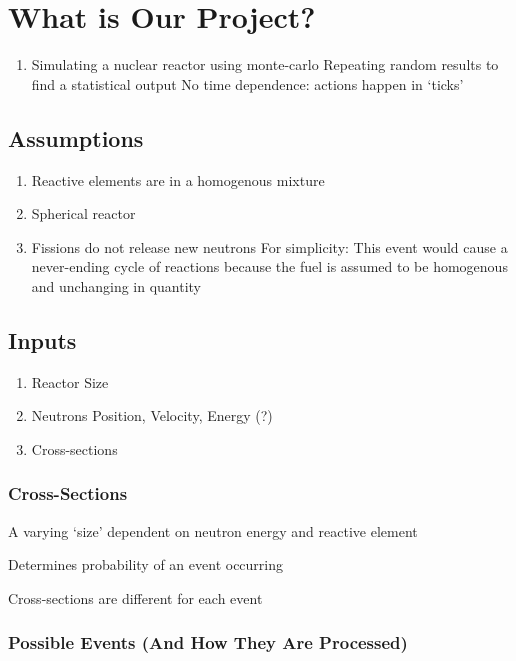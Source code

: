 \documentclass{notes}
\begin{document}
\section{What is Our Project?}

\begin{enumerate}
    \item Simulating a nuclear reactor using monte-carlo
    \subitem Repeating random results to find a statistical output
    \subitem \indicates No time dependence: actions happen in `ticks'
\end{enumerate}

\subsection{Assumptions}

\begin{enumerate}
    \item Reactive elements are in a homogenous mixture
    \item Spherical reactor
    \item Fissions do not release new neutrons
    \subitem For simplicity: This event would cause a never-ending cycle of reactions because the fuel is assumed to be homogenous and unchanging in quantity
\end{enumerate}

\subsection{Inputs}

\begin{enumerate}
    \item Reactor Size
    \item Neutrons
    \subitem Position, Velocity, Energy (?)
    \item Cross-sections
\end{enumerate}

\subsubsection{Cross-Sections}

A varying `size' dependent on neutron energy and reactive element

\indicates Determines probability of an event occurring

Cross-sections are different for each event

\subsubsection{Possible Events (And How They Are Processed)}
\end{document}
